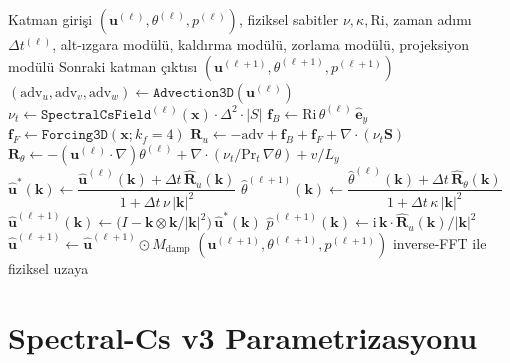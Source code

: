 \begin{algorithm}[H]
\caption{INNATE katman-içi fraksiyonel adım IMEX ilerletme}
\label{alg:imex}
\begin{algorithmic}[1]
\Require Katman girişi $(\mathbf{u}^{(\ell)}, \theta^{(\ell)}, p^{(\ell)})$, fiziksel sabitler $\nu, \kappa, \mathrm{Ri}$, zaman adımı $\Delta t^{(\ell)}$, alt-ızgara modülü, kaldırma modülü, zorlama modülü, projeksiyon modülü
\Ensure Sonraki katman çıktısı $(\mathbf{u}^{(\ell+1)}, \theta^{(\ell+1)}, p^{(\ell+1)})$
\State $(\mathrm{adv}_{u}, \mathrm{adv}_{v}, \mathrm{adv}_{w}) \gets \texttt{Advection3D}(\mathbf{u}^{(\ell)})$ 
\State $\nu_{t} \gets \texttt{SpectralCsField}^{(\ell)}(\mathbf{x}) \cdot \Delta^{2} \cdot |S|$ 
\State $\mathbf{f}_{B} \gets \mathrm{Ri}\,\theta^{(\ell)}\,\hat{\mathbf{e}}_{y}$ 
\State $\mathbf{f}_{F} \gets \texttt{Forcing3D}(\mathbf{x}; k_{f}{=}4)$
\State $\mathbf{R}_{u} \gets -\mathrm{adv} + \mathbf{f}_{B} + \mathbf{f}_{F} + \nabla\cdot(\nu_{t}\mathbf{S})$ 
\State $\mathbf{R}_{\theta} \gets -(\mathbf{u}^{(\ell)}\cdot\nabla)\theta^{(\ell)} + \nabla\cdot(\nu_{t}/\mathrm{Pr}_{t}\,\nabla\theta) + v/L_{y}$
\State $\hat{\mathbf{u}}^{\ast}(\mathbf{k}) \gets \dfrac{\hat{\mathbf{u}}^{(\ell)}(\mathbf{k}) + \Delta t\,\hat{\mathbf{R}}_{u}(\mathbf{k})}{1 + \Delta t\,\nu\,|\mathbf{k}|^{2}}$ 
\State $\hat{\theta}^{(\ell+1)}(\mathbf{k}) \gets \dfrac{\hat{\theta}^{(\ell)}(\mathbf{k}) + \Delta t\,\hat{\mathbf{R}}_{\theta}(\mathbf{k})}{1 + \Delta t\,\kappa\,|\mathbf{k}|^{2}}$ 
\State $\hat{\mathbf{u}}^{(\ell+1)}(\mathbf{k}) \gets \big(I - \mathbf{k}\otimes\mathbf{k}/|\mathbf{k}|^{2}\big)\,\hat{\mathbf{u}}^{\ast}(\mathbf{k})$ 
\State $\hat{p}^{(\ell+1)}(\mathbf{k}) \gets \mathrm{i}\,\mathbf{k}\cdot\hat{\mathbf{R}}_{u}(\mathbf{k})/|\mathbf{k}|^{2}$ 
\State $\hat{\mathbf{u}}^{(\ell+1)} \gets \hat{\mathbf{u}}^{(\ell+1)} \odot M_{\mathrm{damp}}$ 
\State \Return $(\mathbf{u}^{(\ell+1)}, \theta^{(\ell+1)}, p^{(\ell+1)})$ inverse-FFT ile fiziksel uzaya
\end{algorithmic}
\end{algorithm}

\section{Spectral-Cs v3 Parametrizasyonu}
\label{sec:spectral_cs}

